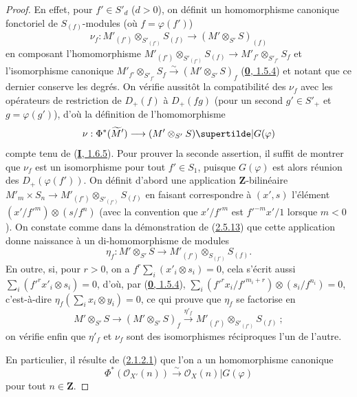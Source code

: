 \begin{proof}
En effet, pour $f'\in S'_d$ ($d>0$), on définit un homomorphisme canonique
fonctoriel de $S_{(f)}$-modules (où $f=\varphi(f')$)
\[
\label{II.2.8.8.1-fr}
  \nu_f:M'_{(f')}\otimes_{S'_{(f')}}S_{(f)}
  \longrightarrow(M'\otimes_{S'}S)_{(f)}
\tag{2.8.8.1}
\]
en composant l'homomorphisme
$M'_{(f')}\otimes_{S'_{(f')}}S_{(f)}\to
M'_{f'}\otimes_{S'_{f'}}S_f$ et l'isomorphisme canonique
$M'_{f'}\otimes_{S'_{f'}}S_f\xrightarrow{\sim}(M'\otimes_{S'}S)_f$
(\hyperref[0.1.5.4-fr]{\textbf{0}, 1.5.4}) et notant que ce dernier conserve les
degrés. On vérifie aussitôt la compatibilité des $\nu_f$ avec les opérateurs
de restriction de $D_+(f)$ à $D_+(fg)$ (pour un second $g'\in S'_+$ et
$g=\varphi(g')$), d'où la définition de l'homomorphisme
\[
  \nu:\Phi^*(\widetilde{M}')
  \longrightarrow(M'\otimes_{S'}S)\supertilde|G(\varphi)
\]
compte tenu de (\hyperref[I.1.6.5-fr]{\textbf{I}, 1.6.5}). Pour prouver la seconde
assertion, il suffit de montrer que $\nu_f$ est un isomorphisme pour tout
$f'\in S_1$, puisque $G(\varphi)$ est alors réunion des
$D_+(\varphi(f'))$. On définit d'abord une application $\mathbf{Z}$-bilinéaire
$M'_m\times S_n\to M'_{(f')}\otimes_{S'_{(f')}}S_{(f)}$ en faisant
correspondre à $(x',s)$ l'élément
$(x'/{f'}^m)\otimes(s/f^n)$ (avec la convention que $x'/{f'}^m$ est
${f'}^{-m}x'/1$
lorsque $m<0$). On constate comme dans la démonstration de
(\hyperref[II.2.5.13-fr]{2.5.13}) que cette application donne naissance à un
di-homomorphisme de modules
\[
  \eta_f:M'\otimes_{S'}S
  \longrightarrow M'_{(f')}\otimes_{S_{(f')}}S_{(f)}.
\]
En outre, si, pour $r>0$, on a
$f^r\sum_i(x'_i\otimes s_i)=0$, cela s'écrit aussi
$\sum_i({f'}^rx'_i\otimes s_i)=0$, d'où, par
(\hyperref[0.1.5.4-fr]{\textbf{0}, 1.5.4}),
$\sum_i({f'}^rx_i/{f'}^{m_i+r})\otimes(s_i/f^{n_i})=0$, c'est-à-dire
$\eta_f(\sum_i x_i\otimes y_i)=0$, ce qui prouve que $\eta_f$ se factorise
en
\[
  M'\otimes_{S'}S\longrightarrow(M'\otimes_{S'}S)_f
  \xrightarrow{\eta'_f}M'_{(f')}\otimes_{S'_{(f')}}S_{(f)}~;
\]
on vérifie enfin que $\eta'_f$ et $\nu_f$ sont des isomorphismes réciproques
l'un de l'autre.

En particulier, il résulte de (\hyperref[II.2.1.2.1-fr]{2.1.2.1}) que l'on a
un homomorphisme canonique
\[
\label{II.2.8.8.2-fr}
  \Phi^*(\mathcal{O}_{X'}(n))\xrightarrow{\sim}
  \mathcal{O}_X(n)|G(\varphi)
\tag{2.8.8.2}
\]
pour tout $n\in\mathbf{Z}$.
\end{proof}

